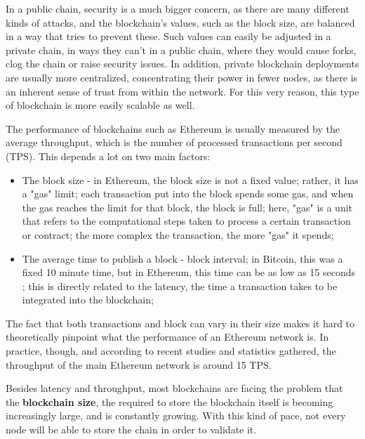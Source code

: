 In a public chain, security is a much bigger concern, as there are many different kinds of attacks, and the blockchain's values, such as the block size, are balanced in a way that tries to prevent these. Such values can easily be adjusted in a private chain, in ways they can't in a public chain, where they would cause forks, clog the chain or raise security issues. In addition, private blockchain deployments are usually more centralized, concentrating their power in fewer nodes, as there is an inherent sense of trust from within the network. For this very reason, this type of blockchain is more easily scalable as well.

The performance of blockchains such as Ethereum is usually measured by the average throughput, which is the number of processed transactions per second (TPS). This depends a lot on two main factors:
\begin{itemize}
\item The block size - in Ethereum, the block size is not a fixed value; rather, it has a "gas" limit; each transaction put into the block spends some gas, and when the gas reaches the limit for that block, the block is full; here, "gas" is a unit that refers to the computational steps taken to process a certain transaction or contract; the more complex the transaction, the more "gas" it spends;
\item The average time to publish a block - block interval; in Bitcoin, this was a fixed 10 minute time, but in Ethereum, this time can be as low as 15 seconds \cite{Scherer2017}; this is directly related to the latency, the time a transaction takes to be integrated into the blockchain;
\end{itemize}

The fact that both transactions and block can vary in their size makes it hard to theoretically pinpoint what the performance of an Ethereum network is. In practice, though, and according to recent studies and statistics gathered, the throughput of the main Ethereum network is around 15 TPS. %

Besides latency and throughput, most blockchains are facing the problem that the \textbf{blockchain size}, the required to store the blockchain itself is becoming increasingly large, and is constantly growing. With this kind of pace, not every node will be able to store the chain in order to validate it.

